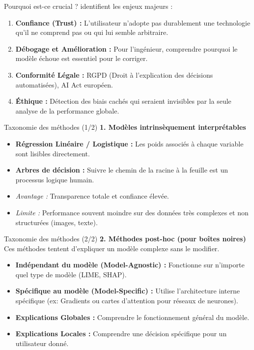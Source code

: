 \documentclass[9pt, aspectratio=169]{beamer}
\begin{document}
\begin{frame}{Pourquoi est-ce crucial ?}
    \cite{Burkart2021A} identifient les enjeux majeurs :
    \begin{enumerate}
        \item \textbf{Confiance (Trust) :} L'utilisateur n'adopte pas durablement une technologie qu'il ne comprend pas ou qui lui semble arbitraire.
        \item \textbf{Débogage et Amélioration :} Pour l'ingénieur, comprendre pourquoi le modèle échoue est essentiel pour le corriger.
        \item \textbf{Conformité Légale :} RGPD (Droit à l'explication des décisions automatisées), AI Act européen.
        \item \textbf{Éthique :} Détection des biais cachés qui seraient invisibles par la seule analyse de la performance globale.
    \end{enumerate}
\end{frame}

\begin{frame}{Taxonomie des méthodes (1/2)}
    \textbf{1. Modèles intrinsèquement interprétables}
    \begin{itemize}
        \item \textbf{Régression Linéaire / Logistique :} Les poids associés à chaque variable sont lisibles directement.
        \item \textbf{Arbres de décision :} Suivre le chemin de la racine à la feuille est un processus logique humain.
        \item \textit{Avantage :} Transparence totale et confiance élevée.
        \item \textit{Limite :} Performance souvent moindre sur des données très complexes et non structurées (images, texte).
    \end{itemize}
\end{frame}

\begin{frame}{Taxonomie des méthodes (2/2)}
    \textbf{2. Méthodes post-hoc (pour boîtes noires)}
    \vspace{0.3cm}
    Ces méthodes tentent d'expliquer un modèle complexe sans le modifier.
    \begin{itemize}
        \item \textbf{Indépendant du modèle (Model-Agnostic) :} Fonctionne sur n'importe quel type de modèle (LIME, SHAP).
        \item \textbf{Spécifique au modèle (Model-Specific) :} Utilise l'architecture interne spécifique (ex: Gradients ou cartes d'attention pour réseaux de neurones).
        \item \textbf{Explications Globales :} Comprendre le fonctionnement général du modèle.
        \item \textbf{Explications Locales :} Comprendre une décision spécifique pour un utilisateur donné.
    \end{itemize}
\end{frame}
\end{document}
